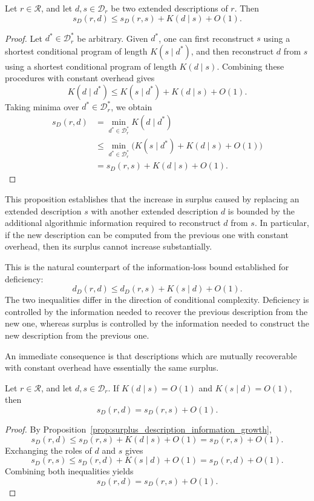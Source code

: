 \begin{proposition}
\label{prop:surplus_description_information_growth}
Let $r\in\mathcal R$, and let $d,s\in\mathcal D_r$ be two extended descriptions of $r$. Then
\[
s_D(r,d) \le s_D(r,s) + K(d\mid s) + O(1).
\]
\end{proposition}
\begin{proof}
Let $d^\ast\in\mathcal D_r^\ast$ be arbitrary. Given $d^\ast$, one can first reconstruct $s$ using a shortest conditional program of length $K(s\mid d^\ast)$, and then reconstruct $d$ from $s$ using a shortest conditional program of length $K(d\mid s)$. Combining these procedures with constant overhead gives
\[
K(d\mid d^\ast) \le K(s\mid d^\ast) + K(d\mid s) + O(1).
\]
Taking minima over $d^\ast\in\mathcal D_r^\ast$, we obtain
\[
\begin{aligned}
s_D(r,d)
& = \min_{d^\ast\in\mathcal D_r^\ast}K(d\mid d^\ast) \\
& \le \min_{d^\ast\in\mathcal D_r^\ast} \bigl(K(s\mid d^\ast)+K(d\mid s)+O(1)\bigr) \\
& = s_D(r,s)+K(d\mid s)+O(1).
\end{aligned}
\]
\end{proof}

This proposition establishes that the increase in surplus caused by replacing an extended description $s$ with another extended description $d$ is bounded by the additional algorithmic information required to reconstruct $d$ from $s$. In particular, if the new description can be computed from the previous one with constant overhead, then its surplus cannot increase substantially.

This is the natural counterpart of the information-loss bound established for deficiency:
\[
d_D(r,d) \le d_D(r,s) + K(s\mid d) + O(1).
\]
The two inequalities differ in the direction of conditional complexity. Deficiency is controlled by the information needed to recover the previous description from the new one, whereas surplus is controlled by the information needed to construct the new description from the previous one.

An immediate consequence is that descriptions which are mutually recoverable with constant overhead have essentially the same surplus.

\begin{corollary}
\label{cor:surplus_description_equivalent}
Let $r\in\mathcal R$, and let $d,s\in\mathcal D_r$. If $K(d\mid s)=O(1)$ and $K(s\mid d)=O(1)$, then
\[
s_D(r,d)=s_D(r,s)+O(1).
\]
\end{corollary}
\begin{proof}
By Proposition~\ref{prop:surplus_description_information_growth},
\[
s_D(r,d) \le s_D(r,s)+K(d\mid s)+O(1) = s_D(r,s)+O(1).
\]
Exchanging the roles of $d$ and $s$ gives
\[
s_D(r,s) \le s_D(r,d)+K(s\mid d)+O(1) = s_D(r,d)+O(1).
\]
Combining both inequalities yields
\[
s_D(r,d)=s_D(r,s)+O(1).
\]
\end{proof}

